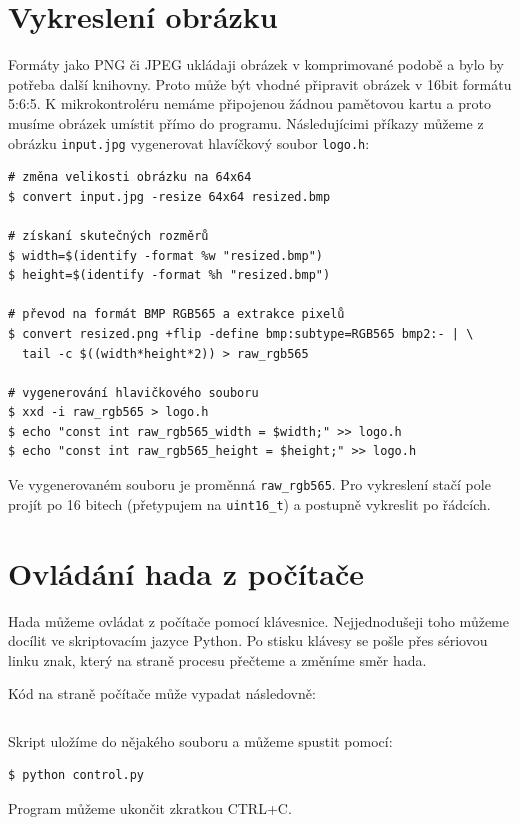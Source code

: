 \documentclass[12pt]{article}
\begin{document}
\section{Vykreslení obrázku}
Formáty jako PNG či JPEG ukládaji obrázek v komprimované podobě a bylo by potřeba další knihovny.
Proto může být vhodné připravit obrázek v 16bit formátu 5:6:5.
K mikrokontroléru nemáme připojenou žádnou pamětovou kartu a proto musíme obrázek umístit přímo do programu.
Následujícimi příkazy můžeme z obrázku \texttt{input.jpg} vygenerovat hlavíčkový soubor \texttt{logo.h}:
\begin{verbatim}
# změna velikosti obrázku na 64x64
$ convert input.jpg -resize 64x64 resized.bmp

# získaní skutečných rozměrů
$ width=$(identify -format %w "resized.bmp")
$ height=$(identify -format %h "resized.bmp")

# převod na formát BMP RGB565 a extrakce pixelů
$ convert resized.png +flip -define bmp:subtype=RGB565 bmp2:- | \
  tail -c $((width*height*2)) > raw_rgb565

# vygenerování hlavičkového souboru
$ xxd -i raw_rgb565 > logo.h 
$ echo "const int raw_rgb565_width = $width;" >> logo.h
$ echo "const int raw_rgb565_height = $height;" >> logo.h
\end{verbatim}

Ve vygenerovaném souboru je proměnná \texttt{raw\_rgb565}.
Pro vykreslení stačí pole projít po 16 bitech (přetypujem na \texttt{uint16_t}) a postupně vykreslit po řádcích.

\section{Ovládání hada z počítače}
Hada můžeme ovládat z počítače pomocí klávesnice.
Nejjednodušeji toho můžeme docílit ve skriptovacím jazyce Python.
Po stisku klávesy se pošle přes sériovou linku znak, který na straně procesu přečteme a změníme směr hada.

\noindent
\begin{minipage}{\linewidth}
Kód na straně počítače může vypadat následovně:
\inputminted{python}{control.py}
  \vspace{0.3cm}
\end{minipage}
Skript uložíme do nějakého souboru a můžeme spustit pomocí:
\begin{verbatim}
$ python control.py
\end{verbatim}
Program můžeme ukončit zkratkou \textsc{CTRL+C}.
\end{document}
